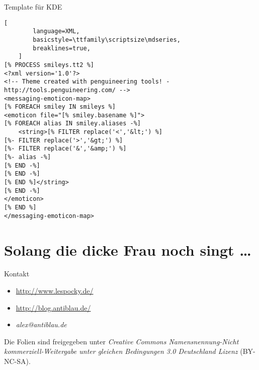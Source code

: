 \documentclass[hyperref={pdfpagelabels=false}]{beamer}
\begin{document}
\begin{frame}[fragile]{Template für KDE}
    \begin{lstlisting}[
        language=XML,
        basicstyle=\ttfamily\scriptsize\mdseries,
        breaklines=true,
    ]
[% PROCESS smileys.tt2 %]
<?xml version='1.0'?>
<!-- Theme created with penguineering tools! - http://tools.penguineering.com/ -->
<messaging-emoticon-map>
[% FOREACH smiley IN smileys %]
<emoticon file="[% smiley.basename %]">
[% FOREACH alias IN smiley.aliases -%]
    <string>[% FILTER replace('<','&lt;') %]
[%- FILTER replace('>','&gt;') %]
[%- FILTER replace('&','&amp;') %]
[%- alias -%]
[% END -%]
[% END -%]
[% END %]</string>
[% END -%]
</emoticon>
[% END %]
</messaging-emoticon-map>
    \end{lstlisting}
\end{frame}

\section*{Solang die dicke Frau noch singt \dots}

\begin{frame}{Kontakt}
    \begin{itemize}
        \item \url{http://www.lespocky.de/}
        \item \url{http://blog.antiblau.de/}
        \item \emph{alex@antiblau.de}
    \end{itemize}

    \vspace{1em}
    \small
    Die Folien sind freigegeben unter \emph{Creative Commons
    Namensnennung-Nicht kommerziell-Weitergabe unter gleichen
    Bedingungen 3.0 Deutschland Lizenz} (BY-NC-SA).
    \normalsize
\end{frame}
\end{document}
